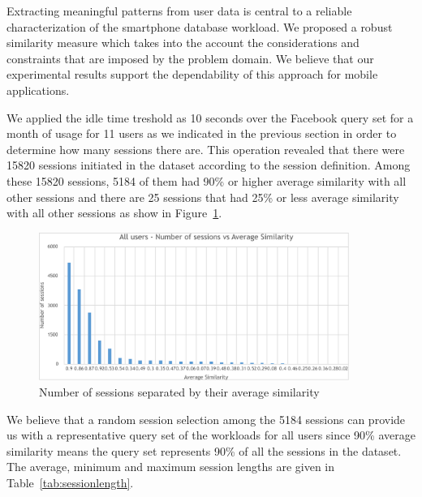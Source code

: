 Extracting meaningful patterns from user data is central to a reliable characterization of the smartphone database workload. We proposed a robust similarity measure which takes into the account the considerations and constraints that are imposed by the problem domain. We believe that our experimental results support the dependability of this approach for mobile applications. 

We applied the idle time treshold as 10 seconds over the Facebook query set for a month of usage for 11 users as we indicated in the previous section in order to determine how many sessions there are. This operation revealed that there were 15820 sessions initiated in the dataset according to the session definition. Among these 15820 sessions, 5184 of them had 90\% or higher average similarity with all other sessions and there are 25 sessions that had 25\% or less average similarity with all other sessions as show in Figure~\ref{fig:averagesimilarity}.

\begin{figure}[h!]
    \centering
    \includegraphics[width=0.9\textwidth]{graphics/allsessions}
    \caption{Number of sessions separated by their average similarity}
    \label{fig:averagesimilarity}
\end{figure}

We believe that a random session selection among the 5184 sessions can provide us with a representative query set of the workloads for all users since 90\% average similarity means the query set represents 90\% of all the sessions in the dataset. The average, minimum and maximum session lengths are given in Table~\ref{tab:sessionlength}.

